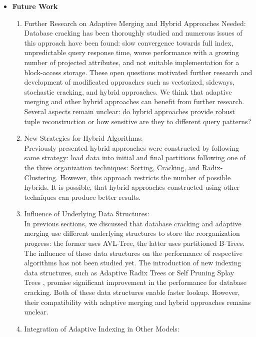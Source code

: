 \documentclass[10pt, conference, compsocconf]{IEEEtran}
\begin{document}
\begin{itemize}
\begin{enumerate}
\end{enumerate}
\item{\textbf{Future Work}}
\begin{enumerate}
\item{Further Research on Adaptive Merging and Hybrid Approaches Needed:}\\
Database cracking has been thoroughly studied and numerous issues of this approach have been found: slow convergence towards full index, unpredictable query response time, worse performance with a growing number of projected attributes, and not suitable implementation for a block-access storage. These open questions motivated further research and development of modificated approaches such as vectorized, sideways, stochastic cracking, and hybrid approaches. We think that adaptive merging and other hybrid approaches can benefit from further research. Several aspects remain unclear: do hybrid approaches provide robust tuple reconstruction or how sensitive are they to different query patterns? \\
\item{New Strategies for Hybrid Algorithms:}\\
Previously presented hybrid approaches were constructed by following same strategy: load data into initial and final partitions following one of the three organization techniques: Sorting, Cracking, and Radix-Clustering. However, this approach restricts the number of possible hybrids. It is possible, that hybrid approaches constructed using other techniques can produce better results.\\
\item{Influence of Underlying Data Structures:}\\
In previous sections, we discussed that database cracking and adaptive merging use different underlying structures to store the reorganization progress: the former uses AVL-Tree, the latter uses partitioned B-Trees. The influence of these data structures on the performance of respective algorithms has not been studied yet. The introduction of new indexing data structures, such as Adaptive Radix Trees \cite{art} or Self Pruning Splay Trees \cite{spst}, promise significant improvement in the performance for database cracking. Both of these data structures enable faster lookup. However, their compatibility with adaptive merging and hybrid approaches remains unclear.\\
\item{Integration of Adaptive Indexing in Other Models:}\\

\end{enumerate}
\end{itemize}
\end{document}
